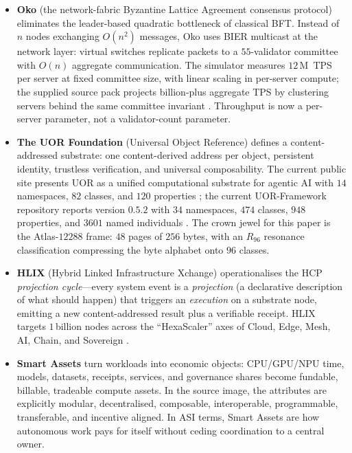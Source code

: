 \documentclass[11pt,letterpaper]{article}
\theoremstyle{remark}
\begin{document}
\begin{itemize}[leftmargin=2em]
\item \textbf{Oko} (the network-fabric Byzantine Lattice Agreement consensus protocol)
eliminates the leader-based quadratic bottleneck of classical BFT. Instead of $n$ nodes
exchanging $O(n^2)$ messages, Oko uses BIER multicast at the network layer: virtual
switches replicate packets to a $55$-validator committee with $O(n)$ aggregate
communication. The simulator measures $12$\,M~TPS per server at fixed committee size, with
linear scaling in per-server compute; the supplied source pack projects billion-plus
aggregate TPS by clustering servers behind the same committee invariant
\cite{oko-threepager,okopipi-l1}. Throughput is now a per-server parameter, not a
validator-count parameter.
\item \textbf{The UOR Foundation} (Universal Object Reference) defines a content-addressed
substrate: one content-derived address per object, persistent identity, trustless
verification, and universal composability. The current public site presents UOR as a
unified computational substrate for agentic AI with $14$ namespaces, $82$ classes, and
$120$ properties \cite{uor-site}; the current UOR-Framework repository reports version
$0.5.2$ with $34$ namespaces, $474$ classes, $948$ properties, and $3601$ named
individuals \cite{uor-framework}. The crown jewel for this paper is the Atlas-$12288$
frame: $48$ pages of $256$ bytes, with an $R_{96}$ resonance classification compressing
the byte alphabet onto $96$ classes.
\item \textbf{HLIX} (Hybrid Linked Infrastructure Xchange) operationalises the HCP
\emph{projection cycle}---every system event is a \emph{projection} (a declarative
description of what should happen) that triggers an \emph{execution} on a substrate node,
emitting a new content-addressed result plus a verifiable receipt. HLIX targets $1$\,billion
nodes across the ``HexaScaler'' axes of Cloud, Edge, Mesh, AI, Chain, and Sovereign
\cite{hlix-hcp}.
\item \textbf{Smart Assets} turn workloads into economic objects: CPU/GPU/NPU time,
models, datasets, receipts, services, and governance shares become fundable, billable,
tradeable compute assets. In the source image, the attributes are explicitly modular,
decentralised, composable, interoperable, programmable, transferable, and incentive
aligned. In ASI terms, Smart Assets are how autonomous work pays for itself without
ceding coordination to a central owner.
\end{itemize}
\end{document}
